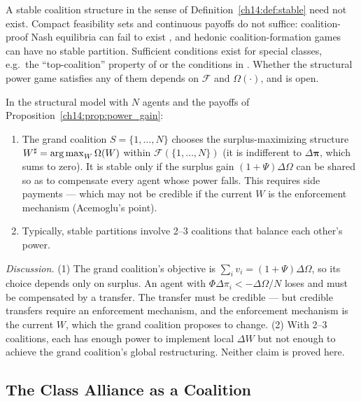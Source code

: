 \documentclass[../structural_economics_book.tex]{subfiles}
\begin{document}
\begin{remark}\label{ch14:rem:existence}
A stable coalition structure in the sense of Definition~\ref{ch14:def:stable} need not exist. Compact feasibility sets and continuous payoffs do not suffice: coalition-proof Nash equilibria can fail to exist \citep{bernheim1987coalition}, and hedonic coalition-formation games can have no stable partition. Sufficient conditions exist for special classes, e.g.\ the ``top-coalition'' property of \citet{banerjee2001core} or the conditions in \citet{bogomolnaia2002stability}. Whether the structural power game satisfies any of them depends on $\mathcal{F}$ and $\Omega(\cdot)$, and is open.
\end{remark}

\begin{conjecture}\label{ch14:thm:formation}
In the structural model with $N$ agents and the payoffs of Proposition~\ref{ch14:prop:power_gain}:
\begin{enumerate}
\item The grand coalition $S = \{1, \ldots, N\}$ chooses the surplus-maximizing structure $W^\sharp = \operatorname*{arg\,max}_{W} \Omega(W)$ within $\mathcal{F}(\{1, \ldots, N\})$ (it is indifferent to $\Delta\boldsymbol{\pi}$, which sums to zero). It is stable only if the surplus gain $(1+\Psi)\Delta\Omega$ can be shared so as to compensate every agent whose power falls. This requires side payments --- which may not be credible if the current $W$ is the enforcement mechanism (Acemoglu's point).
\item Typically, stable partitions involve 2--3 coalitions that balance each other's power.
\end{enumerate}
\end{conjecture}

\noindent\textit{Discussion.} (1) The grand coalition's objective is $\sum_i v_i = (1+\Psi)\Delta\Omega$, so its choice depends only on surplus. An agent with $\Phi\Delta\pi_i < -\Delta\Omega/N$ loses and must be compensated by a transfer. The transfer must be credible --- but credible transfers require an enforcement mechanism, and the enforcement mechanism is the current $W$, which the grand coalition proposes to change. (2) With 2--3 coalitions, each has enough power to implement local $\Delta W$ but not enough to achieve the grand coalition's global restructuring. Neither claim is proved here.


\subsection{The Class Alliance as a Coalition}
\end{document}
